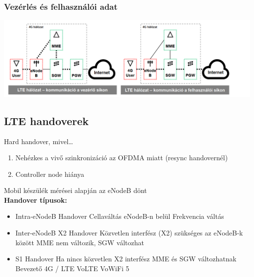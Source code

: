 \documentclass[10pt,a4paper]{article}
\begin{document}
\subsubsection{Vezérlés és felhasználói adat}
\begin{center}
	\includegraphics[width=1\linewidth]{src/LTEfelhvvez}
\end{center}
\subsection{LTE handoverek}
Hard handover, mivel…
\begin{enumerate}
	\item Nehézkes a vivő szinkronizáció az OFDMA miatt (resync handovernél)
	\item Controller node hiánya
\end{enumerate}
Mobil készülék mérései alapján az
eNodeB dönt
\textbf{\\Handover típusok:}
\begin{itemize}
	\item Intra-eNodeB Handover
	\subitem Cellaváltás eNodeB-n belül
	\subitem Frekvencia váltás
	\item Inter-eNodeB X2 Handover
	\subitem Közvetlen interfész (X2) szükséges az
	eNodeB-k között
	\subitem MME nem változik, SGW változhat
	\item S1 Handover
	\subitem Ha nincs közvetlen X2 interfész
	\subitem MME és SGW változhatnak
	Bevezető 4G / LTE VoLTE VoWiFi 5
\end{itemize}
\end{document}
